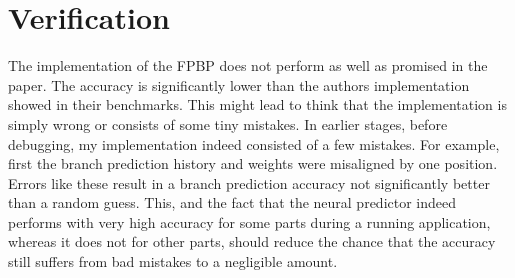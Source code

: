 \documentclass{article}
\begin{document}
\section{Verification}
The implementation of the FPBP does not perform as well as promised in the paper. The accuracy is significantly lower than the authors implementation showed in their benchmarks. This might lead to think that the implementation is simply wrong or consists of some tiny mistakes. 
In earlier stages, before debugging, my implementation indeed consisted of a few mistakes. For example, first the branch prediction history and weights were misaligned by one position. Errors like these result in a branch prediction accuracy not significantly better than a random guess. This, and the fact that the neural predictor indeed performs with very high accuracy for some parts during a running application, whereas it does not for other parts, should reduce the chance that the accuracy still suffers from bad mistakes to a negligible amount.


\end{document}
